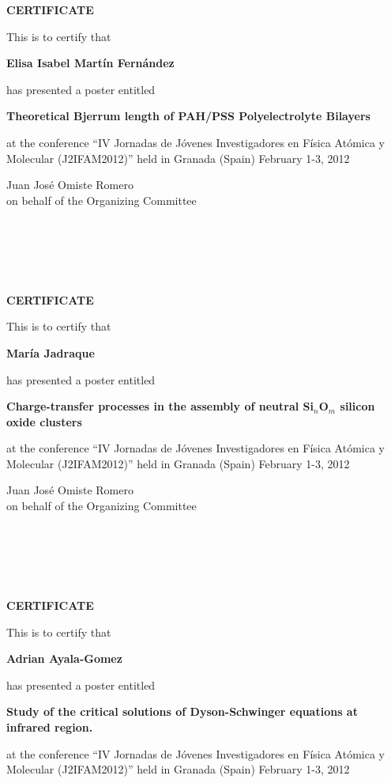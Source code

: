 \documentclass [13pt,a4paper] {letter}
\begin{document}
\pagestyle{empty}
\begin{center}
{\bf {\Huge CERTIFICATE}}

\vspace {1.5cm}
This is to certify that
\vspace {1cm}

{\bf \Large  Elisa  Isabel  Martín Fernández }
\vspace {1cm}

has presented a poster entitled
\vspace {1cm}

{\bf \large  Theoretical Bjerrum length of PAH/PSS Polyelectrolyte Bilayers   }
\vspace {1cm}

at the conference { \textquotedblleft IV Jornadas de Jóvenes Investigadores en Física Atómica y Molecular (J2IFAM2012)\textquotedblright} 
held in Granada (Spain) February 1-3, 2012
\end{center}
\vspace {3cm}
\begin{raggedleft}
Juan José Omiste Romero \\
on behalf of the Organizing Committee
\newpage
\end{raggedleft}
\begin{verbatim}





\end{verbatim}
\pagestyle{empty}
\begin{center}
{\bf {\Huge CERTIFICATE}}

\vspace {1.5cm}
This is to certify that
\vspace {1cm}

{\bf \Large  María    Jadraque }
\vspace {1cm}

has presented a poster entitled
\vspace {1cm}

{\bf \large  Charge-transfer processes in the assembly of neutral Si$_n$O$_m$ silicon oxide clusters  }
\vspace {1cm}

at the conference { \textquotedblleft IV Jornadas de Jóvenes Investigadores en Física Atómica y Molecular (J2IFAM2012)\textquotedblright} 
held in Granada (Spain) February 1-3, 2012
\end{center}
\vspace {3cm}
\begin{raggedleft}
Juan José Omiste Romero \\
on behalf of the Organizing Committee
\newpage
\end{raggedleft}
\begin{verbatim}





\end{verbatim}
\pagestyle{empty}
\begin{center}
{\bf {\Huge CERTIFICATE}}

\vspace {1.5cm}
This is to certify that
\vspace {1cm}

{\bf \Large  Adrian    Ayala-Gomez }
\vspace {1cm}

has presented a poster entitled
\vspace {1cm}

{\bf \large  Study of the critical solutions of Dyson-Schwinger equations at infrared region.   }
\vspace {1cm}

at the conference { \textquotedblleft IV Jornadas de Jóvenes Investigadores en Física Atómica y Molecular (J2IFAM2012)\textquotedblright} 
held in Granada (Spain) February 1-3, 2012
\end{center}
\end{document}
